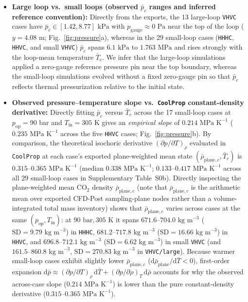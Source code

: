 \documentclass[11pt]{article}
\begin{document}
\begin{itemize}
  \item \textbf{Large loop vs.\ small loops (observed $\bar{p}_c$ ranges and inferred reference convention):} Directly from the exports, the 13 large-loop \texttt{VHVC} cases have $\bar{p}_c \in [1.42, 8.77]\text{ kPa}$ with $p_{\mathrm{gauge}} \approx 0\text{ Pa}$ near the top of the loop ($y = 4.08\text{ m}$; Fig.~\ref{fig:pressure}a), whereas in the 29 small-loop cases (\texttt{HHHC}, \texttt{HHVC}, and small \texttt{VHVC}) $\bar{p}_c$ spans $6.1\text{ kPa}$ to $1.763\text{ MPa}$ and rises strongly with the loop-mean temperature $\bar{T}_c$. We infer that the large-loop simulations applied a zero-gauge reference pressure pin near the top boundary, whereas the small-loop simulations evolved without a fixed zero-gauge pin so that $\bar{p}_c$ reflects thermal pressurization relative to the initial state.
  \item \textbf{Observed pressure--temperature slope vs.\ \texttt{CoolProp} constant-density derivative:} Directly fitting $\bar{p}_c$ versus $\bar{T}_c$ across the 17 small-loop cases at $p_{\mathrm{op}} = 90\text{ bar}$ and $T_{\mathrm{in}} = 305\text{ K}$ gives an \emph{empirical slope} of $0.214\text{ MPa K}^{-1}$ ($0.235\text{ MPa K}^{-1}$ across the five \texttt{HHVC} cases; Fig.~\ref{fig:pressure}b). By comparison, the theoretical isochoric derivative $(\partial p/\partial T)_\rho$ evaluated in \texttt{CoolProp} at each case's exported plane-weighted mean state $(\bar{\rho}_{\mathrm{plane},c}, \bar{T}_c)$ is $0.315\text{--}0.365\text{ MPa K}^{-1}$ (median $0.338\text{ MPa K}^{-1}$; $0.133\text{--}0.417\text{ MPa K}^{-1}$ across all 29 small-loop cases in Supplementary Table~S0b). Directly inspecting the plane-weighted mean $\mathrm{CO}_2$ density $\bar{\rho}_{\mathrm{plane},c}$ (note that $\bar{\rho}_{\mathrm{plane},c}$ is the arithmetic mean over exported CFD-Post sampling-plane nodes rather than a volume-integrated total mass inventory) shows that $\bar{\rho}_{\mathrm{plane},c}$ varies across cases at the same $(p_{\mathrm{op}}, T_{\mathrm{in}})$: at $90\text{ bar}, 305\text{ K}$ it spans $671.6\text{--}704.0\text{ kg m}^{-3}$ ($\mathrm{SD}=9.79\text{ kg m}^{-3}$) in \texttt{HHHC}, $681.2\text{--}717.8\text{ kg m}^{-3}$ ($\mathrm{SD}=16.66\text{ kg m}^{-3}$) in \texttt{HHVC}, and $696.8\text{--}712.1\text{ kg m}^{-3}$ ($\mathrm{SD}=6.62\text{ kg m}^{-3}$) in small \texttt{VHVC} (and $161.5\text{--}860.8\text{ kg m}^{-3}$, $\mathrm{SD}=270.83\text{ kg m}^{-3}$ in \texttt{VHVC/large}). Because warmer small-loop cases exhibit slightly lower $\bar{\rho}_{\mathrm{plane},c}$ ($\mathrm{d}\bar{\rho}_{\mathrm{plane}}/\mathrm{d}\bar{T} < 0$), first-order expansion $\mathrm{d}\bar{p} \approx (\partial p/\partial T)_\rho\,\mathrm{d}\bar{T} + (\partial p/\partial \rho)_T\,\mathrm{d}\bar{\rho}$ accounts for why the observed across-case slope ($0.214\text{ MPa K}^{-1}$) is lower than the pure constant-density derivative ($0.315\text{--}0.365\text{ MPa K}^{-1}$).

\end{itemize}
\end{document}
